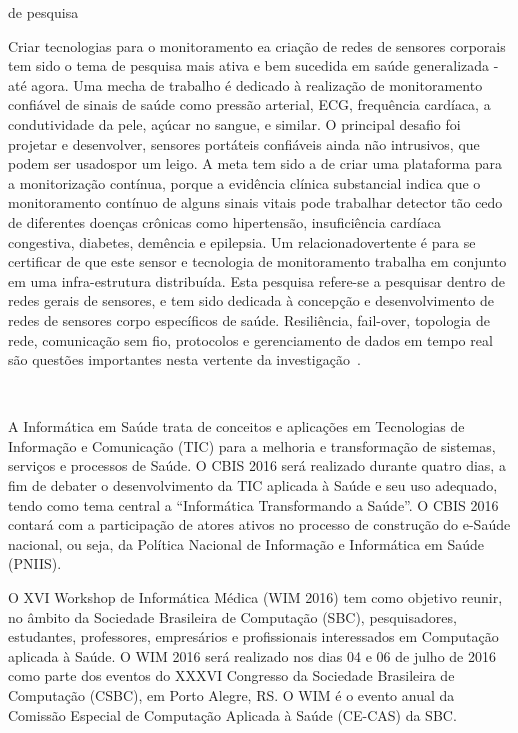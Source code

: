 de pesquisa

Criar tecnologias para o monitoramento ea criação de redes de sensores corporais tem sido o tema de pesquisa mais ativa e bem sucedida em saúde generalizada - até agora. Uma mecha de trabalho é dedicado à realização de monitoramento confiável de sinais de saúde como pressão arterial, ECG, frequência cardíaca, a condutividade da pele, açúcar no sangue, e similar. O principal desafio foi projetar e desenvolver, sensores portáteis confiáveis ​​ainda não intrusivos, que podem ser usados ​​por um leigo. A meta tem sido a de criar uma plataforma para a monitorização contínua, porque a evidência clínica substancial indica que o monitoramento contínuo de alguns sinais vitais pode trabalhar detector tão cedo de diferentes doenças crônicas como hipertensão, insuficiência cardíaca congestiva, diabetes, demência e epilepsia. Um relacionadovertente é para se certificar de que este sensor e tecnologia de monitoramento trabalha em conjunto em uma infra-estrutura distribuída. Esta pesquisa refere-se a pesquisar dentro de redes gerais de sensores, e tem sido dedicada à concepção e desenvolvimento de redes de sensores corpo específicos de saúde. Resiliência, fail-over, topologia de rede, comunicação sem fio, protocolos e gerenciamento de dados em tempo real são questões importantes nesta vertente da investigação~\cite{bardram2008}.


~\cite{sbc2016} ~\cite{ieee2016}




A Informática em Saúde trata de conceitos e aplicações em Tecnologias de Informação e Comunicação (TIC) para a melhoria e transformação de sistemas, serviços e processos de Saúde. O CBIS 2016 será realizado durante quatro dias, a fim de debater o desenvolvimento da TIC aplicada à Saúde e seu uso adequado, tendo como tema central a “Informática Transformando a Saúde”. O CBIS 2016 contará com a participação de atores ativos no processo de construção do e-Saúde nacional, ou seja, da Política Nacional de Informação e Informática em Saúde (PNIIS).~\cite{cbis2016}

O XVI Workshop de Informática Médica (WIM 2016) tem como objetivo reunir, no âmbito da Sociedade Brasileira de Computação (SBC), pesquisadores, estudantes, professores, empresários e profissionais interessados em Computação aplicada à Saúde. O WIM 2016 será realizado nos dias 04 e 06 de julho de 2016 como parte dos eventos do XXXVI Congresso da Sociedade Brasileira de Computação (CSBC), em Porto Alegre, RS. O WIM é o evento anual da Comissão Especial de Computação Aplicada à Saúde (CE-CAS) da SBC.~\cite{wim2016}


